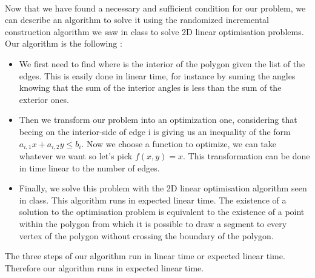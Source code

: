 \paragraph{}
Now that we have found a necessary and sufficient condition for our problem, we can describe an algorithm to solve it using the randomized incremental construction algorithm we saw in class to solve 2D linear optimisation problems. Our algorithm is the following :
\begin{itemize}
	\item We first need to find where is the interior of the polygon given the list of the edges. This is easily done in linear time, for instance by suming the angles knowing that the sum of the interior angles is less than the sum of the exterior ones.
	\item Then we transform our problem into an optimization one, considering that beeing on the interior-side of edge i is giving us an inequality of the form $a_{i,1}x+a_{i,2}y \leqslant b_{i}$. Now we choose a function to optimize, we can take whatever we want so let's pick $f(x,y)=x$. This transformation can be done in time linear to the number of edges.
	\item Finally, we solve this problem with the 2D linear optimisation algorithm seen in class. This algorithm runs in expected linear time. The existence of a solution to the optimisation problem is equivalent to the existence of a point within the polygon from which it is possible to draw a segment to every vertex of the polygon without crossing the boundary of the polygon.
\end{itemize}
 
The three steps of our algorithm run in linear time or expected linear time. Therefore our algorithm runs in expected linear time.
